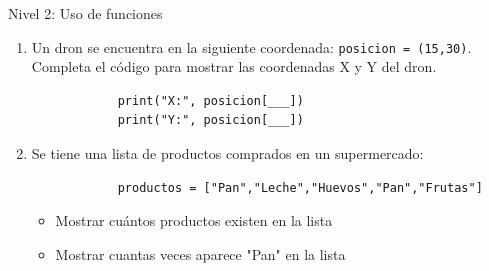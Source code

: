 \documentclass{beamer}
\begin{document}
    \begin{frame}[fragile, t]{Nivel 2: Uso de funciones}
        \begin{enumerate}
            \item[6.] Un dron se encuentra en la siguiente coordenada: \texttt{posicion = (15,30)}. 
            Completa el código para mostrar las coordenadas X y Y del dron.
            \begin{verbatim}
            print("X:", posicion[___])
            print("Y:", posicion[___])
            \end{verbatim}
            \item[7.] Se tiene una lista de productos comprados en un supermercado:
            \begin{verbatim}
            productos = ["Pan","Leche","Huevos","Pan","Frutas"]
            \end{verbatim}
            \begin{itemize}
                \item Mostrar cuántos productos existen en la lista
                \item Mostrar cuantas veces aparece "Pan" en la lista
            \end{itemize}
        \end{enumerate}
    \end{frame}
\end{document}
